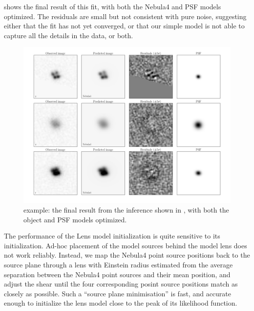 \documentclass[useAMS,usenatbib]{mn2e}
\begin{document}
 shows the final result of this fit, with both
the Nebula4 and PSF models optimized. The residuals are small but not
consistent with pure noise, suggesting either that the fit has not yet
converged, or that our simple model is not able to capture all the details
in the data, or both.


\begin{figure}
\centerline{
\includegraphics[width=0.9\linewidth]{figs/H1413+117_10x10arcsec_progress-09_optimizing_Nebula4.png}}
\caption{\LT example: the final result from the inference shown in
, with both the object and PSF models
optimized.}
\label{fig:H1413example-final}
\end{figure}

The performance of the Lens model initialization is quite sensitive to its
initialization. Ad-hoc placement of the model sources behind the 
model lens does not work reliably. Instead, we map the Nebula4 point source
positions back to the source plane through a lens with Einstein radius
estimated from the average separation between the Nebula4 point sources and
their mean position, and adjust the shear until the four corresponding
posint source positions match as closely as possible. Such a ``source plane
minimisation'' is fast, and accurate enough to initialize the lens model
close to the peak of its likelihood function. 


\end{document}
